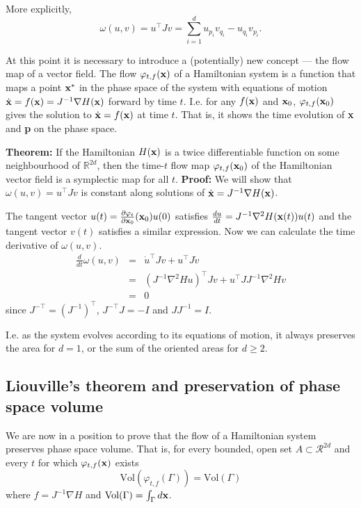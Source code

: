 More explicitly,
\begin{equation*}
	\omega(u,v) = u^\top Jv = \sum_{i=1}^d u_{p_i} v_{q_i} - u_{q_i} v_{p_i}.
\end{equation*}

At this point it is necessary to introduce a (potentially) new concept --- the flow map of a vector field. The flow $\varphi_{t,f}({\bf x})$ of a Hamiltonian system is a function that maps a point ${\bf x}^*$ in the phase space of the system with equations of motion $\dot{\bf x} = f({\bf x}) =J^{-1}\nabla H({\bf x})$ forward by time $t$. I.e. for any $f({\bf x})$ and ${\bf x}_0$, $\varphi_{t,f}({\bf x}_0)$ gives the solution to $\dot{\bf x}=f({\bf x})$ at time $t$. That is, it shows the time evolution of {\bf x} and {\bf p} on the phase space.

{\bf Theorem:} If the Hamiltonian $H({\bf x})$ is a twice differentiable function on some neighbourhood of $\mathbb{R}^{2d}$, then the time-$t$ flow map $\varphi_{t,f}({\bf x}_0)$ of the Hamiltonian vector field is a symplectic map for all $t$.
{\bf Proof:} We will show that $\omega(u,v)=u^\top J v$ is constant along solutions of $\dot{\bf x} = J^{-1}\nabla H({\bf x})$.

The tangent vector $u(t) = \frac{\partial \varphi_t}{\partial {\bf x}_0}({\bf x}_0)u(0)$ satisfies $\frac{du}{dt} = J^{-1}\nabla^2H({\bf x}(t))u(t)$ and the tangent vector $v(t)$ satisfies a similar expression. Now we can calculate the time derivative of $\omega(u,v)$.
\begin{eqnarray*}
	\frac{d}{dt}\omega(u,v) &=& \dot{u}^{\top}Jv+u^\top J\dot{v}\\
		&=& (J^{-1}\nabla^2Hu)^\top Jv + u^\top JJ^{-1}\nabla^2Hv\\
		&=& 0
\end{eqnarray*}
since $J^{-\top}=(J^{-1})^\top$, $J^{-\top}J=-I$ and $JJ^{-1} = I$.

I.e. as the system evolves according to its equations of motion, it always preserves the area for $d=1$, or the sum of the oriented areas for $d \geq2$.


\subsection{Liouville's theorem and preservation of phase space volume}
We are now in a position to prove that the flow of a Hamiltonian system preserves phase space volume. That is, for every bounded, open set $A\subset\mathcal{R}^{2d}$ and every $t$ for which $\varphi_{t,f}({\bf x})$ exists
$$\text{Vol}(\varphi_{t,f}(\Gamma))=\text{Vol}(\Gamma)$$
where $f=J^{-1}\nabla H$ and $\text{Vol}(\Gamma) = \int_{\Gamma}d{\bf x}$.

